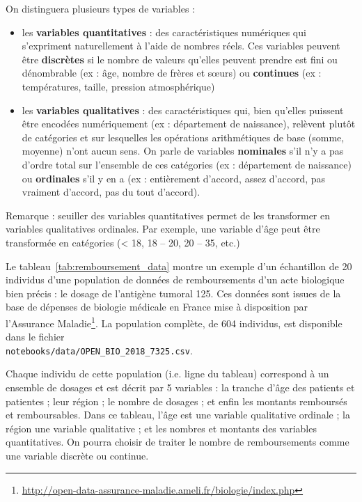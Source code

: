 On distinguera plusieurs types de variables :
\begin{itemize}
\item les \textbf{variables quantitatives} : des caractéristiques numériques
  qui s'expriment naturellement à l'aide de nombres réels. Ces variables
  peuvent être \textbf{discrètes} si le nombre de valeurs qu'elles peuvent
  prendre est fini ou dénombrable (ex : âge, nombre de frères et s\oe{}urs) ou
  \textbf{continues} (ex : températures, taille, pression atmosphérique)
\item les \textbf{variables qualitatives} : des caractéristiques qui, bien
  qu'elles puissent être encodées numériquement (ex : département de
  naissance), relèvent plutôt de catégories et sur lesquelles les opérations
  arithmétiques de base (somme, moyenne) n'ont aucun sens. On parle de
  variables \textbf{nominales} s'il n'y a pas d'ordre total sur l'ensemble de
  ces catégories (ex : département de naissance) ou \textbf{ordinales} s'il y
  en a (ex : entièrement d'accord, assez d'accord, pas vraiment d'accord, pas
  du tout d'accord).
\end{itemize}

Remarque : seuiller des variables quantitatives permet de les transformer en
variables qualitatives ordinales. Par exemple, une variable d'âge peut être
transformée en catégories (< 18, 18 -- 20, 20 -- 35, etc.)

Le tableau~\ref{tab:remboursement_data} montre un exemple d'un échantillon de
20 individus d'une population de données de remboursements d'un acte biologique
bien précis : le dosage de l'antigène tumoral 125. Ces données sont issues de
la base de dépenses de biologie médicale en France mise à disposition par
l'Assurance
Maladie\footnote{\url{http://open-data-assurance-maladie.ameli.fr/biologie/index.php}}. La
population complète, de 604 individus, est disponible dans le fichier\\
\texttt{notebooks/data/OPEN\_BIO\_2018\_7325.csv}.

Chaque individu de cette population (i.e. ligne du tableau) correspond à un
ensemble de dosages et est décrit par 5 variables : la tranche d'âge des
patients et patientes ; leur région ; le nombre de dosages ; et enfin les
montants remboursés et remboursables. Dans ce tableau, l'âge est une variable
qualitative ordinale ; la région une variable qualitative ; et les nombres et
montants des variables quantitatives. On pourra choisir de traiter le nombre de
remboursements comme une variable discrète ou continue.


